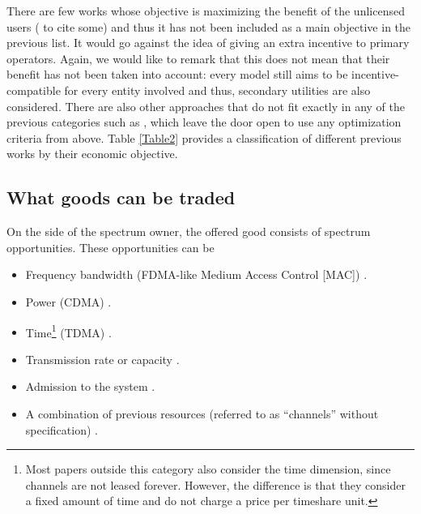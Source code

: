There are few works whose objective is maximizing the benefit of the unlicensed users (\cite{ref:Niyato2007_Game,ref:Illeri2005,ref:Niyato2009_Dyn} to cite some) and thus it has not been included as a main objective in the previous list. It would go against the idea of giving an extra incentive to primary operators. Again, we would like to remark that this does not mean that their benefit has not been taken into account: every model still aims to be incentive-compatible for every entity involved and thus, secondary utilities are also considered. There are also other approaches that do not fit exactly in any of the previous categories such as \cite{ref:Illeri2005,ref:Zhou2008}, which leave the door open to use any optimization criteria from above. Table \ref{Table2} provides a classification of different previous works by their economic objective.



\subsection{What goods can be traded}
\label{subsec:What}
On the side of the spectrum owner, the offered good consists of spectrum opportunities. These opportunities can be
\begin{itemize}
\item Frequency bandwidth (FDMA-like Medium Access Control [MAC]) \cite{ref:Niyato2007_Game,ref:Niyato2008_Comp,ref:Duan2010_Cog,ref:Duan2010_Comp,ref:Zhu2012_Dyn,ref:Xu2010,ref:Sengupta2007,ref:Sengupta2009,ref:Niyato2008_Mark,ref:Niyato2010,ref:Wang2010_Spec}. 
\item Power (CDMA) \cite{ref:Wang2008,ref:Yu2010,ref:Gao2011,ref:Huang2006,ref:Jayaweera2009,ref:Jayaweera2010,ref:Vazquez2010}.
\item Time\footnote{Most papers outside this category also consider the time dimension, since channels are not leased forever. However, the difference is that they consider a fixed amount of time and do not charge a price per timeshare unit.} (TDMA)  \cite{ref:Xu2011,ref:Simeone2008,ref:Zhang2009,ref:Li2011,ref:Duan2011_Contract,ref:Niyato2007_Eq}.
\item Transmission rate or capacity \cite{ref:Illeri2005,ref:Jia2008,ref:Maille2009} .
\item Admission to the system \cite{ref:Kaskebar2012,ref:Mutlu2008,ref:Yang2011}.
\item A combination of previous resources (referred to as ``channels'' without specification) \cite{ref:Xu2012,ref:Zhou2008,ref:Zhu2012,ref:Xing2007,ref:Jia2009_Rev,ref:Niyato2009_Dyn,ref:Niyato2007_Hier,ref:Gao2011_MAP,ref:Zhou2009_TRUST}. 
\end{itemize}


